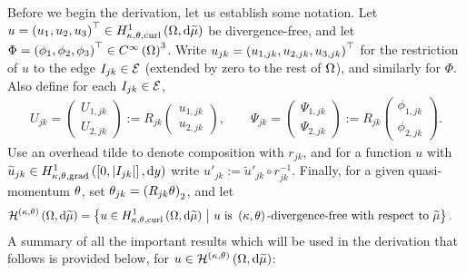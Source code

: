 Before we begin the derivation, let us establish some notation.
Let $u=\left( u_1,u_2,u_3 \right)^\top\in H^1_{\kappa,\theta,\mathrm{curl}}\left( \Omega, \mathrm{d}\widetilde{\mu} \right)$ be divergence-free, and let $\Phi=\left( \phi_1,\phi_2,\phi_3 \right)^\top\in C^{\infty}\left( \Omega \right)^3$.
Write $u_{jk}=\left( u_{1,jk},u_{2,jk},u_{3,jk} \right)^\top$ for the restriction of $u$ to the edge $I_{jk}\in\mathcal{E}$ (extended by zero to the rest of $\Omega$), and similarly for $\Phi$.
Also define for each $I_{jk}\in\mathcal{E}$, 
\begin{align*}
	U_{jk} = \begin{pmatrix} U_{1,jk} \\ U_{2,jk} \end{pmatrix} := R_{jk} \begin{pmatrix} u_{1,jk} \\ u_{2,jk} \end{pmatrix},
	\qquad
	\Psi_{jk} = \begin{pmatrix} \Psi_{1,jk} \\ \Psi_{2,jk} \end{pmatrix} := R_{jk} \begin{pmatrix} \phi_{1,jk} \\ \phi_{2,jk} \end{pmatrix}.
\end{align*}
Use an overhead tilde to denote composition with $r_{jk}$, and for a function $u$ with $\widetilde{u}_{jk}\in H^1_{\kappa,\theta,\mathrm{grad}}\left( \left[ 0,\left\lvert I_{jk} \right\rvert \right], \mathrm{d}y \right)$ write $u'_{jk} := \widetilde{u}'_{jk} \circ r_{jk}^{-1}$.
Finally, for a given quasi-momentum $\theta$, set $\theta_{jk} = \left(  R_{jk}\theta  \right)_2$, and let
\begin{align*}
	\mathcal{H}^{\left( \kappa, \theta \right)}\left( \Omega, \mathrm{d}\widetilde{\mu} \right) &=
	\left\{  u\in H^1_{\kappa,\theta,\mathrm{curl}}\left( \Omega, \mathrm{d}\widetilde{\mu} \right) \ \middle\vert \  u \text{ is } \left( \kappa, \theta \right)\text{-divergence-free with respect to } \widetilde{\mu} \right\}.
\end{align*}
A summary of all the important results which will be used in the derivation that follows is provided below, for $u\in\mathcal{H}^{\left( \kappa, \theta \right)}\left( \Omega, \mathrm{d}\widetilde{\mu} \right)$:
